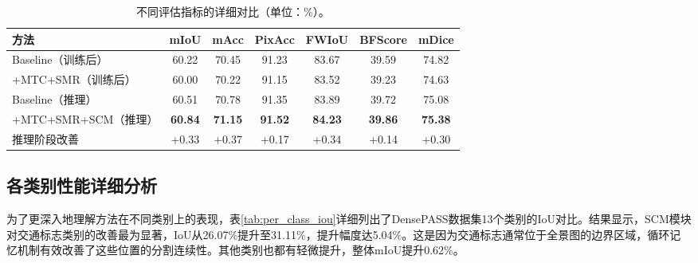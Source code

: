 \begin{table}[t]
\centering
\caption{不同评估指标的详细对比（单位：\%）。}
\label{tab:metric_breakdown}
\small
\begin{tabular}{lcccccc}
\toprule
\textbf{方法} & \textbf{mIoU} & \textbf{mAcc} & \textbf{PixAcc} & \textbf{FWIoU} & \textbf{BFScore} & \textbf{mDice} \\
\midrule
Baseline（训练后） & 60.22 & 70.45 & 91.23 & 83.67 & 39.59 & 74.82 \\
+MTC+SMR（训练后） & 60.00 & 70.22 & 91.15 & 83.52 & 39.23 & 74.63 \\
\midrule
Baseline（推理） & 60.51 & 70.78 & 91.35 & 83.89 & 39.72 & 75.08 \\
+MTC+SMR+SCM（推理） & \textbf{60.84} & \textbf{71.15} & \textbf{91.52} & \textbf{84.23} & \textbf{39.86} & \textbf{75.38} \\
\midrule
推理阶段改善 & +0.33 & +0.37 & +0.17 & +0.34 & +0.14 & +0.30 \\
\bottomrule
\end{tabular}
\end{table}

\subsection{各类别性能详细分析}

为了更深入地理解方法在不同类别上的表现，表\ref{tab:per_class_iou}详细列出了DensePASS数据集13个类别的IoU对比。结果显示，SCM模块对交通标志类别的改善最为显著，IoU从26.07\%提升至31.11\%，提升幅度达5.04\%。这是因为交通标志通常位于全景图的边界区域，循环记忆机制有效改善了这些位置的分割连续性。其他类别也都有轻微提升，整体mIoU提升0.62\%。

